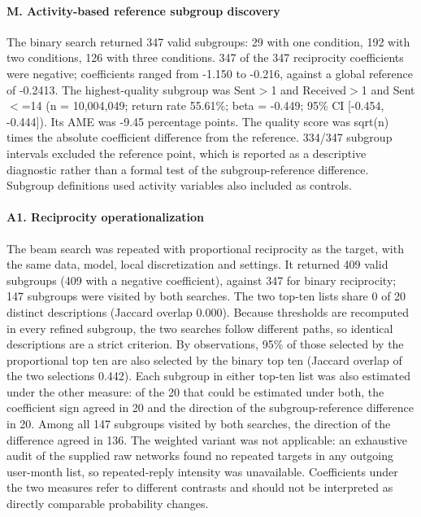 \paragraph{M. Activity-based reference subgroup discovery}
The binary search returned 347 valid subgroups: 29 with one condition, 192 with two conditions, 126 with three conditions. 347 of the 347 reciprocity coefficients were negative; coefficients ranged from -1.150 to -0.216, against a global reference of -0.2413. The highest-quality subgroup was Sent$>$1 and Received$>$1 and Sent$<$=14 (n = 10,004,049; return rate 55.61\%; beta = -0.449; 95\% CI [-0.454, -0.444]). Its AME was -9.45 percentage points. The quality score was sqrt(n) times the absolute coefficient difference from the reference. 334/347 subgroup intervals excluded the reference point, which is reported as a descriptive diagnostic rather than a formal test of the subgroup-reference difference. Subgroup definitions used activity variables also included as controls.

\paragraph{A1. Reciprocity operationalization}
The beam search was repeated with proportional reciprocity as the target, with the same data, model, local discretization and settings. It returned 409 valid subgroups (409 with a negative coefficient), against 347 for binary reciprocity; 147 subgroups were visited by both searches. The two top-ten lists share 0 of 20 distinct descriptions (Jaccard overlap 0.000). Because thresholds are recomputed in every refined subgroup, the two searches follow different paths, so identical descriptions are a strict criterion. By observations, 95\% of those selected by the proportional top ten are also selected by the binary top ten (Jaccard overlap of the two selections 0.442). Each subgroup in either top-ten list was also estimated under the other measure: of the 20 that could be estimated under both, the coefficient sign agreed in 20 and the direction of the subgroup-reference difference in 20. Among all 147 subgroups visited by both searches, the direction of the difference agreed in 136. The weighted variant was not applicable: an exhaustive audit of the supplied raw networks found no repeated targets in any outgoing user-month list, so repeated-reply intensity was unavailable. Coefficients under the two measures refer to different contrasts and should not be interpreted as directly comparable probability changes.

